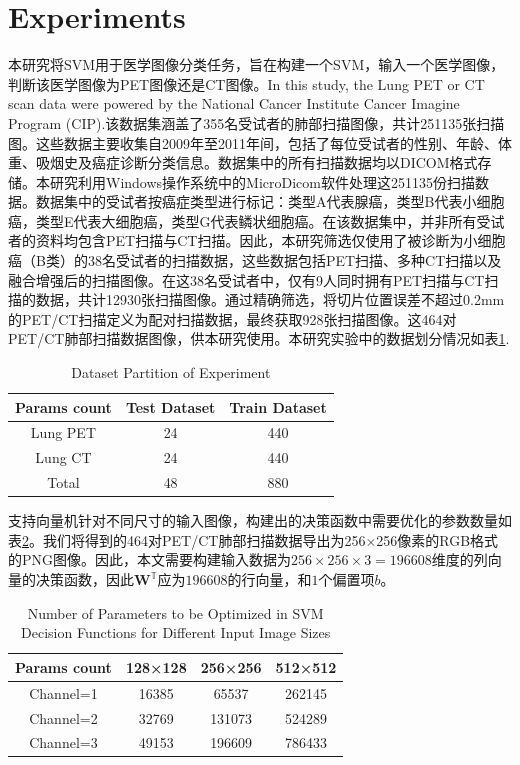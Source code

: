 \documentclass[twocolumn]{article}
\begin{document}
\section{Experiments}
本研究将SVM用于医学图像分类任务，旨在构建一个SVM，输入一个医学图像，判断该医学图像为PET图像还是CT图像。In this study, the Lung PET or CT scan data\cite{li_large-scale_2020} were powered by the National Cancer Institute Cancer Imagine Program (CIP).该数据集涵盖了355名受试者的肺部扫描图像，共计251135张扫描图。这些数据主要收集自2009年至2011年间，包括了每位受试者的性别、年龄、体重、吸烟史及癌症诊断分类信息。数据集中的所有扫描数据均以DICOM格式存储。本研究利用Windows操作系统中的MicroDicom软件处理这251135份扫描数据。数据集中的受试者按癌症类型进行标记：类型A代表腺癌，类型B代表小细胞癌，类型E代表大细胞癌，类型G代表鳞状细胞癌。在该数据集中，并非所有受试者的资料均包含PET扫描与CT扫描。因此，本研究筛选仅使用了被诊断为小细胞癌（B类）的38名受试者的扫描数据，这些数据包括PET扫描、多种CT扫描以及融合增强后的扫描图像。在这38名受试者中，仅有9人同时拥有PET扫描与CT扫描的数据，共计12930张扫描图像。通过精确筛选，将切片位置误差不超过0.2mm的PET/CT扫描定义为配对扫描数据，最终获取928张扫描图像。这464对PET/CT肺部扫描数据图像，供本研究使用。本研究实验中的数据划分情况如表\ref{tab:dataset_partition_1}.

\begin{table}[h]
	\centering
	\caption{Dataset Partition of Experiment}
	\label{tab:dataset_partition_1}
	\begin{tabular}{ccc}
		\toprule
		Params count & Test Dataset & Train Dataset \\
		\midrule
		Lung PET & 24   & 440 \\
		Lung CT  & 24   & 440 \\
		Total    & 48   & 880 \\
		\bottomrule
	\end{tabular}
\end{table}

支持向量机针对不同尺寸的输入图像，构建出的决策函数中需要优化的参数数量如表\ref{tab:params_count}。我们将得到的464对PET/CT肺部扫描数据导出为256×256像素的RGB格式的PNG图像。因此，本文需要构建输入数据为$256 \times 256 \times 3=196608$维度的列向量的决策函数，因此$\mathbf{W}^\mathbb{T}$应为$196608$的行向量，和$1$个偏置项$b$。

\begin{table}[h]
	\centering
	\caption{Number of Parameters to be Optimized in SVM Decision Functions for Different Input Image Sizes}
	\label{tab:params_count}
	\begin{tabular}{cccc}
		\toprule
		Params count & 128×128 & 256×256 & 512×512 \\
		\midrule
		Channel=1    & 16385   & 65537   & 262145  \\
		Channel=2    & 32769   & 131073  & 524289  \\
		Channel=3    & 49153   & 196609  & 786433  \\
		\bottomrule
	\end{tabular}
\end{table}
\end{document}
